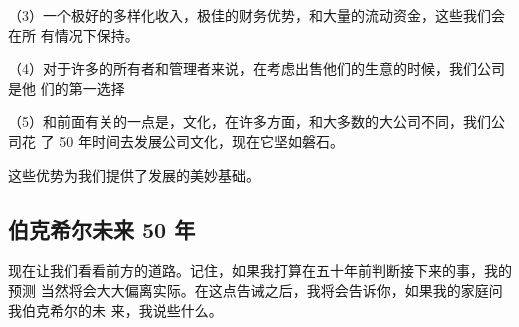 \documentclass[UTF8,a4paper,zihao=-4,fontset = windows]{ctexart} %
\begin{document}
（3）一个极好的多样化收入，极佳的财务优势，和大量的流动资金，这些我们会在所
有情况下保持。

（4）对于许多的所有者和管理者来说，在考虑出售他们的生意的时候，我们公司是他
们的第一选择

（5）和前面有关的一点是，文化，在许多方面，和大多数的大公司不同，我们公司花
了 50 年时间去发展公司文化，现在它坚如磐石。

这些优势为我们提供了发展的美妙基础。

\subsection{伯克希尔未来 50 年}
现在让我们看看前方的道路。记住，如果我打算在五十年前判断接下来的事，我的预测
当然将会大大偏离实际。在这点告诫之后，我将会告诉你，如果我的家庭问我伯克希尔的未
来，我说些什么。
\end{document}
